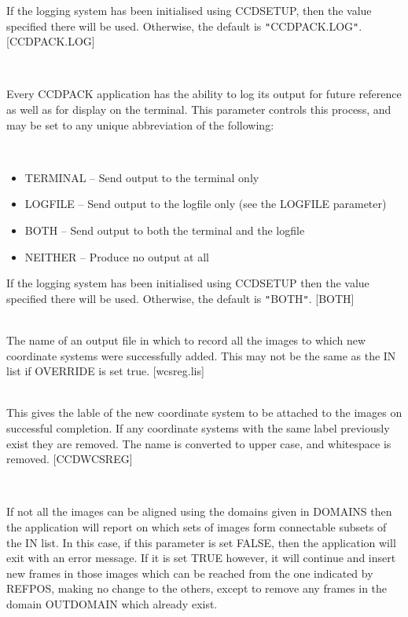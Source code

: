 \documentclass[twoside,11pt]{article}
\newcommand{\htmlref}[2]{#1}
\renewcommand{\_}{\texttt{\symbol{95}}}
\newcommand{\qt}[1]{{\tt "}#1{\tt "}}
\newcommand{\xroutine}[1]{\htmlref{{\sc #1}}{#1}}
\newcommand{\sstsubsection}[1]{ \item[{#1}] \mbox{} \\}
\newcommand{\sstitemlist}[1]{
  \mbox{} \\
  \vspace{-3.5ex}
  \begin{itemize}
     #1
  \end{itemize}
}
\newcommand{\sstitem}{\item}
\newcommand{\sstsubsection}[1]{\item[{#1}]}
\newcommand{\sstitemlist}[1]{
      \begin{itemize}
         #1
      \end{itemize}
      \\
   }
\newcommand{\sstitem}{\item}
\begin{document}
{{{         If the logging system has been initialised using \xroutine{CCDSETUP},
         then the value specified there will be used. Otherwise, the
         default is \qt{CCDPACK.LOG}.
         [CCDPACK.LOG]
      }
      \sstsubsection{
         LOGTO = LITERAL (Read)
      } {
         Every CCDPACK application has the ability to log its output
         for future reference as well as for display on the terminal.
         This parameter controls this process, and may be set to any
         unique abbreviation of the following:
         \sstitemlist{

            \sstitem
               TERMINAL  -- Send output to the terminal only

            \sstitem
               LOGFILE   -- Send output to the logfile only (see the
                               LOGFILE parameter)

            \sstitem
               BOTH      -- Send output to both the terminal and the
                               logfile

            \sstitem
               NEITHER   -- Produce no output at all

         }
         If the logging system has been initialised using \xroutine{CCDSETUP}
         then the value specified there will be used. Otherwise, the
         default is \qt{BOTH}.
         [BOTH]
      }
      \sstsubsection{
         NAMELIST = LITERAL (Read)
      } {
         The name of an output file in which to record all the images
         to which new coordinate systems were successfully added.
         This may not be the same as the IN list if OVERRIDE is set
         true.
         [wcsreg.lis]
      }
      \sstsubsection{
         OUTDOMAIN = LITERAL (Read)
      } {
         This gives the lable of the new coordinate system to be attached
         to the images on successful
         completion.  If any coordinate systems with the same label previously exist
         they are removed.  The name is converted
         to upper case, and whitespace is removed.
         [CCD\_WCSREG]
      }
      \sstsubsection{
         OVERRIDE = \_LOGICAL (Read)
      } {
         If not all the images can be aligned using the domains given in
         DOMAINS then the application will report on which sets of images
         form connectable subsets of the IN list.  In this case, if this
         parameter is set FALSE, then the application will exit with an
         error message.  If it is set TRUE however, it will continue and
         insert new frames in those images which can be reached from the
         one indicated by REFPOS, making no change to the others, except
         to remove any frames in the domain OUTDOMAIN which already exist.

}}}
\end{document}
